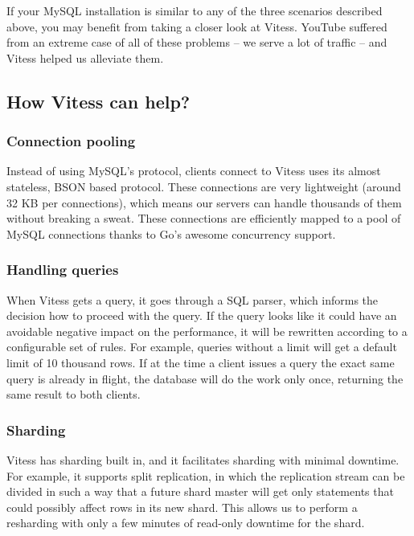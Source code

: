 If your MySQL installation is similar to any of the three scenarios described
above, you may benefit from taking a closer look at Vitess. YouTube suffered
from an extreme case of all of these problems – we serve a lot of traffic – and
Vitess helped us alleviate them.

\subsection{How Vitess can help?}\hypertarget{how-vitess-can-help}{}\label{how-vitess-can-help}

\subsubsection{Connection pooling}\hypertarget{connection-pooling}{}\label{connection-pooling}

Instead of using MySQL’s protocol, clients connect to Vitess uses its almost
stateless, BSON based protocol. These connections are very lightweight (around
32 KB per connections), which means our servers can handle thousands of them
without breaking a sweat. These connections are efficiently mapped to a pool of
MySQL connections thanks to Go’s awesome concurrency support.

\subsubsection{Handling queries}\hypertarget{handling-queries}{}\label{handling-queries}

When Vitess gets a query, it goes through a SQL parser, which informs the
decision how to proceed with the query. If the query looks like it could have an
avoidable negative impact on the performance, it will be rewritten according to
a configurable set of rules. For example, queries without a limit will get a
default limit of 10 thousand rows. If at the time a client issues a query the
exact same query is already in flight, the database will do the work only once,
returning the same result to both clients.

\subsubsection{Sharding}\hypertarget{sharding}{}\label{sharding}

Vitess has sharding built in, and it facilitates sharding with minimal downtime.
For example, it supports split replication, in which the replication stream can
be divided in such a way that a future shard master will get only statements
that could possibly affect rows in its new shard. This allows us to perform a
resharding with only a few minutes of read-only downtime for the shard.

